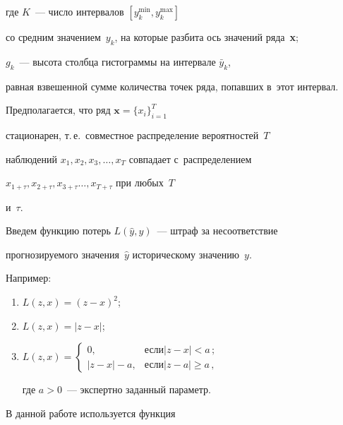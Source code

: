 где $K$~--- число интервалов $\left[y_k^{\min},y_k^{\max}\right]$




со средним значением~$y_k$, на которые разбита ось значений ряда~\textbf{x};


$g_k$~--- высота столбца гистограммы на интервале $\bar y_k$,


равная взвешенной сумме количества точек ряда, попавших в~этот интервал.





Предполагается, что ряд $\mathbf{x} = \{x_i\}_{i=1}^T$


стационарен, т.\,е.\ совместное распределение вероятностей~$T$


наблюдений $x_1,x_2,x_3,\ldots,x_T$ совпадает с~распределением


$x_{1+\tau},x_{2+\tau},x_{3+\tau}\ldots ,x_{T+\tau}$ при любых~$T$


и~$\tau$.





Введем функцию потерь $L(\hat{y},y)$~--- штраф за несоответствие


прогнозируемого значения~$\hat{y}$ историческому значению~$y$.


Например:


\begin{enumerate}[(1)]


    \item  $L(z,x) = (z-x)^2$;


    \item  $L(z,x) = |z-x|$;


    \item  $L(z,x) = \displaystyle\begin{cases}


                           0, &\mbox{если} |z-x|<a\,;\\


                           |z-x|-a,  &\mbox{если} |z-a|\geq a\,,


                            \end{cases}$\newline


где  $a>0$~--- экспертно заданный параметр.


\end{enumerate}


В данной работе используется функция


